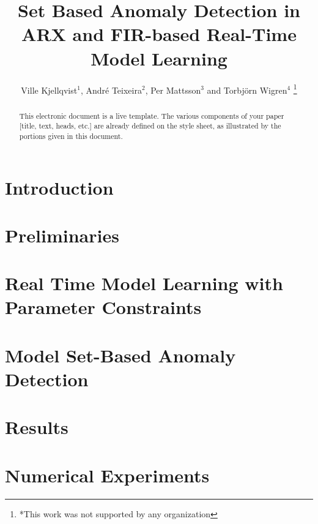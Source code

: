 \documentclass[letterpaper, 10 pt, conference]{ieeeconf}  %
\title{\LARGE \bf
Set Based Anomaly Detection in ARX and FIR-based Real-Time Model Learning
}
\author{Ville Kjellqvist$^{1}$, André Teixeira$^{2}$,
Per Mattsson$^{3}$ and Torbjörn Wigren$^{4}$%
\thanks{*This work was not supported by any organization}%
}
\begin{document}
\maketitle
\thispagestyle{empty}
\pagestyle{empty}


\begin{abstract}

This electronic document is a live template. The various components of your paper [title, text, heads, etc.] are already defined on the style sheet, as illustrated by the portions given in this document.

\end{abstract}

\section{Introduction}

\section{Preliminaries}


\section{Real Time Model Learning with Parameter Constraints}


\section{Model Set-Based Anomaly Detection}


\section{Results}

\section{Numerical Experiments}
\appendix

\printbibliography
\end{document}
